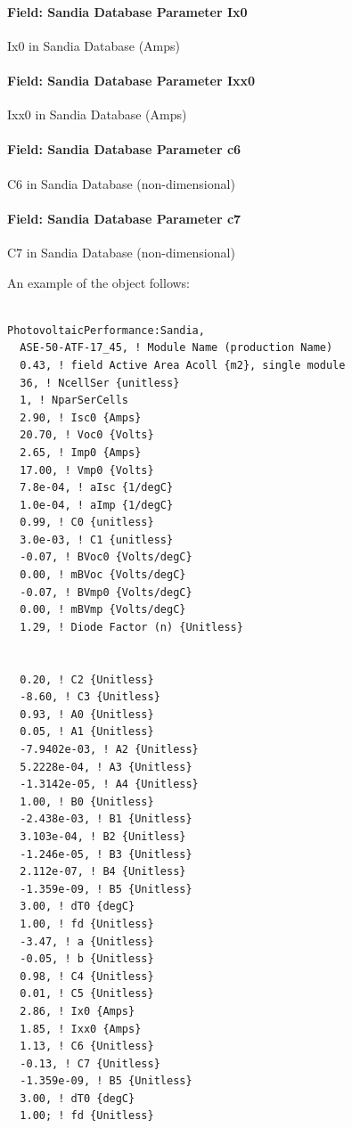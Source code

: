 \paragraph{Field: Sandia Database Parameter Ix0}\label{field-sandia-database-parameter-ix0}

Ix0 in Sandia Database (Amps)

\paragraph{Field: Sandia Database Parameter Ixx0}\label{field-sandia-database-parameter-ixx0}

Ixx0 in Sandia Database (Amps)

\paragraph{Field: Sandia Database Parameter c6}\label{field-sandia-database-parameter-c6}

C6 in Sandia Database (non-dimensional)

\paragraph{Field: Sandia Database Parameter c7}\label{field-sandia-database-parameter-c7}

C7 in Sandia Database (non-dimensional)

An example of the object follows:

\begin{lstlisting}

PhotovoltaicPerformance:Sandia,
  ASE-50-ATF-17_45, ! Module Name (production Name)
  0.43, ! field Active Area Acoll {m2}, single module
  36, ! NcellSer {unitless}
  1, ! NparSerCells
  2.90, ! Isc0 {Amps}
  20.70, ! Voc0 {Volts}
  2.65, ! Imp0 {Amps}
  17.00, ! Vmp0 {Volts}
  7.8e-04, ! aIsc {1/degC}
  1.0e-04, ! aImp {1/degC}
  0.99, ! C0 {unitless}
  3.0e-03, ! C1 {unitless}
  -0.07, ! BVoc0 {Volts/degC}
  0.00, ! mBVoc {Volts/degC}
  -0.07, ! BVmp0 {Volts/degC}
  0.00, ! mBVmp {Volts/degC}
  1.29, ! Diode Factor (n) {Unitless}


  0.20, ! C2 {Unitless}
  -8.60, ! C3 {Unitless}
  0.93, ! A0 {Unitless}
  0.05, ! A1 {Unitless}
  -7.9402e-03, ! A2 {Unitless}
  5.2228e-04, ! A3 {Unitless}
  -1.3142e-05, ! A4 {Unitless}
  1.00, ! B0 {Unitless}
  -2.438e-03, ! B1 {Unitless}
  3.103e-04, ! B2 {Unitless}
  -1.246e-05, ! B3 {Unitless}
  2.112e-07, ! B4 {Unitless}
  -1.359e-09, ! B5 {Unitless}
  3.00, ! dT0 {degC}
  1.00, ! fd {Unitless}
  -3.47, ! a {Unitless}
  -0.05, ! b {Unitless}
  0.98, ! C4 {Unitless}
  0.01, ! C5 {Unitless}
  2.86, ! Ix0 {Amps}
  1.85, ! Ixx0 {Amps}
  1.13, ! C6 {Unitless}
  -0.13, ! C7 {Unitless}
  -1.359e-09, ! B5 {Unitless}
  3.00, ! dT0 {degC}
  1.00; ! fd {Unitless}
\end{lstlisting}

